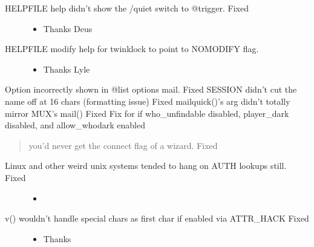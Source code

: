 \documentclass[letterpaper,10pt,english]{sphinxmanual}
\begin{document}
\begin{description}
\begin{itemize}
\end{itemize}

\item[{HELPFILE \sphinxhyphen{} help didn’t show the /quiet switch to @trigger. \sphinxhyphen{} Fixed}] \leavevmode\begin{itemize}
\item {} 
\sphinxAtStartPar
Thanks Deus 

\end{itemize}

\item[{HELPFILE \sphinxhyphen{} modify help for twinklock to point to NOMODIFY flag.}] \leavevmode\begin{itemize}
\item {} 
\sphinxAtStartPar
Thanks Lyle

\end{itemize}

\end{description}

\sphinxAtStartPar
Option incorrectly shown in @list options mail. \sphinxhyphen{} Fixed
SESSION didn’t cut the name off at 16 chars (formatting issue) \sphinxhyphen{} Fixed
mailquick()’s arg didn’t totally mirror MUX’s mail()  \sphinxhyphen{} Fixed
Fix for if who\_unfindable disabled, player\_dark disabled, and allow\_whodark enabled
\begin{quote}

\sphinxAtStartPar
you’d never get the connect flag of a wizard. \sphinxhyphen{} Fixed
\end{quote}
\begin{description}
\item[{Linux and other weird unix systems tended to hang on AUTH lookups still. \sphinxhyphen{} Fixed}] \leavevmode\begin{itemize}
\item {} 
\sphinxAtStartPar
{}

\end{itemize}

\item[{v() wouldn’t handle special chars as first char if enabled via ATTR\_HACK \sphinxhyphen{} Fixed}] \leavevmode\begin{itemize}
\item {} 
\sphinxAtStartPar
Thanks 

\end{itemize}

\end{description}
\end{document}
